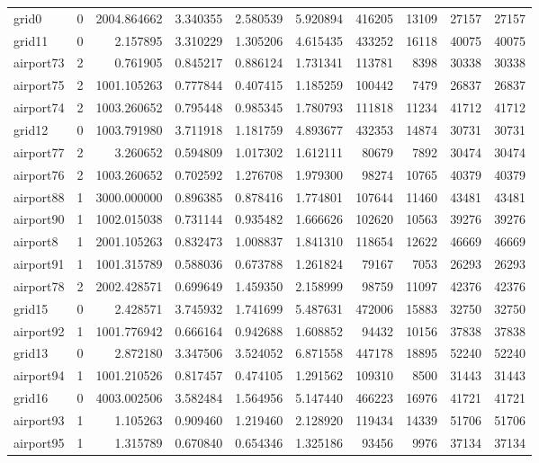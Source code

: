 \begin{longtable}{|l|r|r|r|r|r|r|r|r|r|}
grid0 & 0 & 2004.864662 & 3.340355 & 2.580539 & 5.920894 & 416205 & 13109 & 27157 & 27157 \\
grid11 & 0 & 2.157895 & 3.310229 & 1.305206 & 4.615435 & 433252 & 16118 & 40075 & 40075 \\
airport73 & 2 & 0.761905 & 0.845217 & 0.886124 & 1.731341 & 113781 & 8398 & 30338 & 30338 \\
airport75 & 2 & 1001.105263 & 0.777844 & 0.407415 & 1.185259 & 100442 & 7479 & 26837 & 26837 \\
airport74 & 2 & 1003.260652 & 0.795448 & 0.985345 & 1.780793 & 111818 & 11234 & 41712 & 41712 \\
grid12 & 0 & 1003.791980 & 3.711918 & 1.181759 & 4.893677 & 432353 & 14874 & 30731 & 30731 \\
airport77 & 2 & 3.260652 & 0.594809 & 1.017302 & 1.612111 & 80679 & 7892 & 30474 & 30474 \\
airport76 & 2 & 1003.260652 & 0.702592 & 1.276708 & 1.979300 & 98274 & 10765 & 40379 & 40379 \\
airport88 & 1 & 3000.000000 & 0.896385 & 0.878416 & 1.774801 & 107644 & 11460 & 43481 & 43481 \\
airport90 & 1 & 1002.015038 & 0.731144 & 0.935482 & 1.666626 & 102620 & 10563 & 39276 & 39276 \\
airport8 & 1 & 2001.105263 & 0.832473 & 1.008837 & 1.841310 & 118654 & 12622 & 46669 & 46669 \\
airport91 & 1 & 1001.315789 & 0.588036 & 0.673788 & 1.261824 & 79167 & 7053 & 26293 & 26293 \\
airport78 & 2 & 2002.428571 & 0.699649 & 1.459350 & 2.158999 & 98759 & 11097 & 42376 & 42376 \\
grid15 & 0 & 2.428571 & 3.745932 & 1.741699 & 5.487631 & 472006 & 15883 & 32750 & 32750 \\
airport92 & 1 & 1001.776942 & 0.666164 & 0.942688 & 1.608852 & 94432 & 10156 & 37838 & 37838 \\
grid13 & 0 & 2.872180 & 3.347506 & 3.524052 & 6.871558 & 447178 & 18895 & 52240 & 52240 \\
airport94 & 1 & 1001.210526 & 0.817457 & 0.474105 & 1.291562 & 109310 & 8500 & 31443 & 31443 \\
grid16 & 0 & 4003.002506 & 3.582484 & 1.564956 & 5.147440 & 466223 & 16976 & 41721 & 41721 \\
airport93 & 1 & 1.105263 & 0.909460 & 1.219460 & 2.128920 & 119434 & 14339 & 51706 & 51706 \\
airport95 & 1 & 1.315789 & 0.670840 & 0.654346 & 1.325186 & 93456 & 9976 & 37134 & 37134 \\

\end{longtable}
